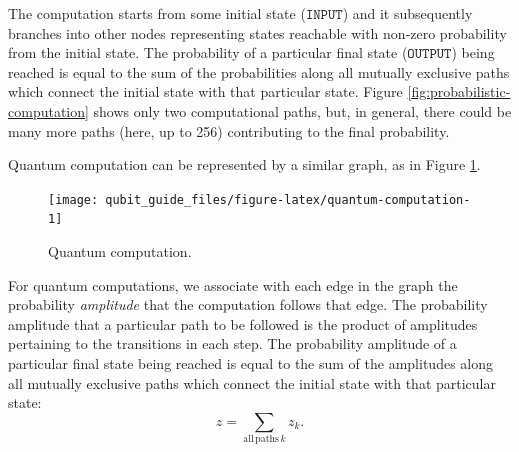 \documentclass[fleqn,a4paper]{article}
\theoremstyle{definition}
\theoremstyle{definition}
\theoremstyle{definition}
\theoremstyle{definition}
\theoremstyle{remark}
\begin{document}
The computation starts from some initial state (\(\texttt{INPUT}\)) and it subsequently branches into other nodes representing states reachable with non-zero probability from the initial state.
The probability of a particular final state (\(\texttt{OUTPUT}\)) being reached is equal to the sum of the probabilities along all mutually exclusive paths which connect the initial state with that particular state.
Figure \ref{fig:probabilistic-computation} shows only two computational paths, but, in general, there could be many more paths (here, up to 256) contributing to the final probability.

Quantum computation can be represented by a similar graph, as in Figure \ref{fig:quantum-computation}.

\begin{figure}[H]

{\centering \texttt{[image: qubit\_guide\_files/figure-latex/quantum-computation-1]} 

}

\caption{Quantum computation.}\label{fig:quantum-computation}
\end{figure}

For quantum computations, we associate with each edge in the graph the probability \emph{amplitude} that the computation follows that edge.
The probability amplitude that a particular path to be followed is the product of amplitudes pertaining to the transitions in each step.
The probability amplitude of a particular final state being reached is equal to the sum of the amplitudes along all mutually exclusive paths which connect the initial state with that particular state:
\[
  z = \sum_{\mathrm{all\,paths}\,k} z_k.
\]
\end{document}
